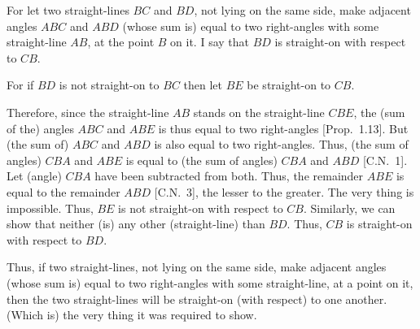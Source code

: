 \begin{Parallel}{}{}
{For let two
straight-lines $BC$ and $BD$, not lying on the same side,  make adjacent angles $ABC$ and $ABD$ (whose sum is)
equal to two right-angles with some straight-line $AB$, at the point $B$ on it. I say
that $BD$ is  straight-on with respect to $CB$.

For if $BD$ is not straight-on to $BC$ then let $BE$ be straight-on to $CB$.

Therefore, since the straight-line $AB$ stands on the straight-line $CBE$, the (sum of the) angles $ABC$ and $ABE$ is thus equal to two right-angles [Prop.~1.13]. But (the sum of) $ABC$ and $ABD$ is also equal to two right-angles.
Thus, 
(the sum of angles) $CBA$ and $ABE$ is equal to (the sum of angles) $CBA$ and $ABD$ [C.N.~1]. Let (angle)
$CBA$ have been subtracted from both. Thus, the remainder $ABE$ is
equal to the remainder $ABD$ [C.N.~3], the lesser to the greater. The very thing is impossible. Thus, $BE$ is not straight-on with respect to $CB$. Similarly, we can
show that neither (is) any other (straight-line)   than $BD$.
Thus, $CB$ is straight-on with respect to $BD$.

Thus, if two straight-lines, not lying on the same side,  make adjacent angles (whose sum is) equal to two right-angles with some straight-line, at a point on it, then the two straight-lines
will be straight-on (with respect) to one another. (Which is) the very thing it
was required to show.}
\end{Parallel}

